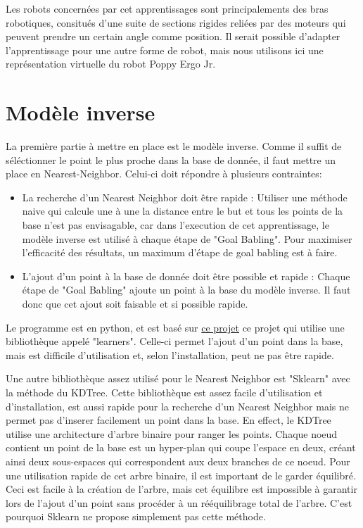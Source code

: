 \documentclass[11pt,french]{article}
\begin{document}
Les robots concernées par cet apprentissages sont principalements des bras robotiques, consitués d'une suite de sections rigides reliées par des moteurs qui peuvent prendre un certain angle comme position. Il serait possible d'adapter l'apprentissage pour une autre forme de robot, mais nous utilisons ici une représentation virtuelle du robot Poppy Ergo Jr.


\section{Modèle inverse}

La première partie à mettre en place est le modèle inverse. Comme il suffit de séléctionner le point le plus proche dans la base de donnée, il faut mettre un place en Nearest-Neighbor. Celui-ci doit répondre à plusieurs contraintes:
\begin{itemize}
    \item La recherche d'un Nearest Neighbor doit être rapide : Utiliser une méthode naive qui calcule une à une la distance entre le but et tous les points de la base n'est pas envisagable, car dans l'execution de cet apprentissage, le modèle inverse est utilisé à chaque étape de "Goal Babling". Pour maximiser l'efficacité des résultats, un maximum d'étape de goal babling est à faire.
    \item L'ajout d'un point à la base de donnée doit être possible et rapide : Chaque étape de "Goal Babling" ajoute un point à la base du modèle inverse. Il faut donc que cet ajout soit faisable et si possible rapide.
\end{itemize}

Le programme est en python, et est basé sur \href{http://www.fabien.benureau.com/recode/benureau2015_gb/benureau2015_gb.html}{ce projet} ce projet qui utilise une bibliothèque appelé "learners". Celle-ci permet l'ajout d'un point dans la base, mais est difficile d'utilisation et, selon l'installation, peut ne pas être rapide.

Une autre bibliothèque assez utilisé pour le Nearest Neighbor est "Sklearn" avec la méthode du KDTree. Cette bibliothèque est assez facile d'utilisation et d'installation, est aussi rapide pour la recherche d'un Nearest Neighbor mais ne permet pas d'inserer facilement un point dans la base. En effect, le KDTree utilise une architecture d'arbre binaire pour ranger les points. Chaque noeud contient un point de la base est un hyper-plan qui coupe l'espace en deux, créant ainsi deux sous-espaces qui correspondent aux deux branches de ce noeud. Pour une utilisation rapide de cet arbre binaire, il est important de le garder équilibré. Ceci est facile à la création de l'arbre, mais cet équilibre est impossible à garantir lors de l'ajout d'un point sans procéder à un rééquilibrage total de l'arbre. C'est pourquoi Sklearn ne propose simplement pas cette méthode.
\end{document}
